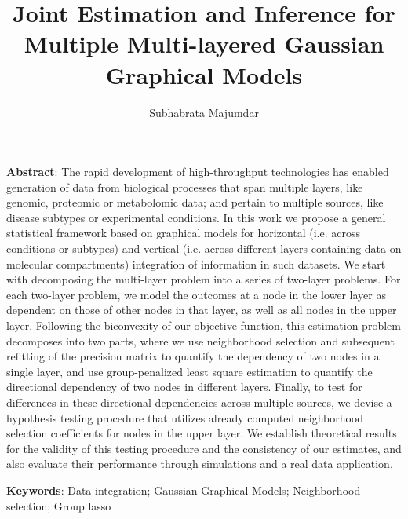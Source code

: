 \documentclass[12pt, letterpaper]{article}
\numberwithin{equation}{section}
\begin{document}
\newtheorem{Theorem}{Theorem}[section]
\newtheorem{Lemma}[Theorem]{Lemma}
\newtheorem{Corollary}[Theorem]{Corollary}
\newtheorem{Proposition}[Theorem]{Proposition}
\newtheorem{Conjecture}[Theorem]{Conjecture}
\theoremstyle{definition} \newtheorem{Definition}[Theorem]{Definition}
\newtheorem{Example}{Example}[section]
\newtheorem{Algorithm}{Algorithm}
\newtheorem{Remark}{Remark}

\title{Joint Estimation and Inference for Multiple Multi-layered Gaussian Graphical Models}
\date{}
\author{Subhabrata Majumdar}
\maketitle

\noindent\textbf{Abstract}: 
The rapid development of high-throughput technologies has enabled generation of data from biological processes that span multiple layers, like genomic, proteomic or metabolomic data; and pertain to multiple sources, like disease subtypes or experimental conditions. In this work we propose a general statistical framework based on graphical models for horizontal (i.e. across conditions or subtypes) and vertical (i.e. across different layers containing data on molecular compartments) integration of information in such datasets. We start with decomposing the multi-layer problem into a series of two-layer problems. For each two-layer problem, we model the outcomes at a node in the lower layer as dependent on those of other nodes in that layer, as well as all nodes in the upper layer. Following the biconvexity of our objective function, this estimation problem decomposes into two parts, where we use neighborhood selection and subsequent refitting of the precision matrix to quantify the dependency of two nodes in a single layer, and use group-penalized least square estimation to quantify the directional dependency of two nodes in different layers. Finally, to test for differences in these directional dependencies across multiple sources, we devise a hypothesis testing procedure that utilizes already computed neighborhood selection coefficients for nodes in the upper layer. We establish theoretical results for the validity of this testing procedure and the consistency of our estimates, and also evaluate their performance through simulations and a real data application.

\vspace{.5cm}
\noindent\textbf{Keywords}: Data integration; Gaussian Graphical Models; Neighborhood selection; Group lasso
\end{document}
